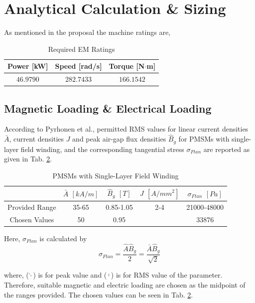 \documentclass [a4 paper, 11pt, titlepage] {article}
\begin{document}
	\section{Analytical Calculation \& Sizing}
	As mentioned in the proposal the machine ratings are,
	\begin{table}[h]
		\begin{center}
			\begin{tabular}{c|c|c}
				Power [kW] &  Speed [rad/s] &  Torque [N$\cdot$m]\\
				\hline
				$46.9790$ & $282.7433$ & $166.1542$
			\end{tabular}
		\end{center}
		\caption{Required EM Ratings}
		\label{fig:EMratings}
	\end{table}
	

	
	\subsection{Magnetic Loading \& Electrical Loading}
	According to Pyrhonen et al., permitted RMS values for linear current densities $\bar{A}$, current densities $J$ and peak air-gap flux densities $\hat{B}_g$ for PMSMs with single-layer field winding, and the corresponding tangential stress $\sigma_{Ftan}$ are reported as given in Tab. \ref{fig:EMoperations}.
	\begin{table}[h]
		\begin{center}
			\begin{tabular}{c|c|c|c||c}
				 & $\bar{A}$ $[kA/m]$ & $\hat{B}_g$ $[T]$ & $J$ $[A/mm^2]$ & $\sigma_{Ftan}$ $[Pa]$ \\
				\hline
				Provided Range & 35-65 &  0.85-1.05 & 2-4 & 21000-48000\\
				Chosen Values & 50 &  0.95 &  & 33876\\
			\end{tabular}
		\end{center}
		\caption{PMSMs with Single-Layer Field Winding \cite{pyrhonen_design_2014}}
		\label{fig:EMoperations}
	\end{table}
	
	Here, $\sigma_{Ftan}$ is calculated by
	\begin{equation}
		\sigma_{Ftan}=\frac{\hat{A}\hat{B}_g}{2}=\frac{\bar{A}\hat{B}_g}{\sqrt{2}}
	\end{equation}
	
	where, ($\hat{\cdot}$) is for peak value and ($\bar{\cdot}$) is for RMS value of the parameter.
	Therefore, suitable magnetic and electric loading are chosen as the midpoint of the ranges provided. The chosen values can be seen in Tab. \ref{fig:EMoperations}.
	
\end{document}
